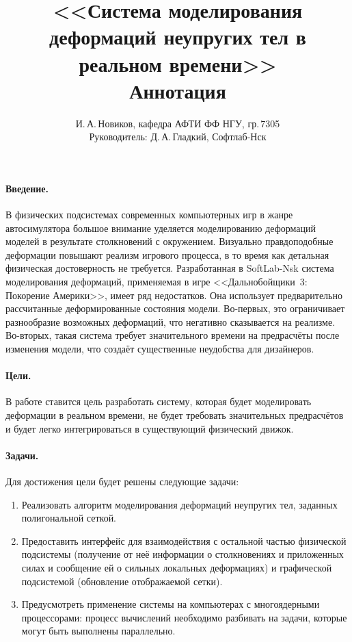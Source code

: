 \documentclass[a4paper,11pt,twocolumn]{article}
\author{И.\,А.\,Новиков, кафедра АФТИ ФФ НГУ, гр.\,7305\\ Руководитель: Д.\,А.\,Гладкий, Софтлаб-Нск}
\title{<<Система моделирования деформаций неупругих тел в реальном времени>>\\ Аннотация}
\begin{document}
  \maketitle
  \thispagestyle{empty}
  \paragraph{Введение.}
    В физических подсистемах современных компьютерных игр в жанре автосимулятора большое внимание
    уделяется моделированию деформаций моделей в результате столкновений с окружением. Визуально
    правдоподобные деформации повышают реализм игрового процесса, в то время как детальная
    физическая достоверность не требуется. Разработанная в SoftLab-Nsk система моделирования
    деформаций, применяемая в игре <<Дальнобойщики~3: Покорение Америки>>, имеет ряд недостатков.
    Она использует предварительно рассчитанные деформированные состояния модели. Во-первых, это
    ограничивает разнообразие возможных деформаций, что негативно сказывается на реализме.
    Во-вторых, такая система требует значительного времени на предрасчёты после изменения модели,
    что создаёт существенные неудобства для дизайнеров.
  \paragraph{Цели.}
    В работе ставится цель разработать систему, которая будет моделировать деформации в реальном
    времени, не будет требовать значительных предрасчётов и будет легко интегрироваться в
    существующий физический движок.
  \newpage
  \paragraph{Задачи.}
    Для достижения цели будет решены следующие задачи:
    \begin{enumerate}
      \item Реализовать алгоритм моделирования деформаций неупругих тел, заданных полигональной сеткой.
      \item Предоставить интерфейс для взаимодействия с остальной частью физической подсистемы
        (получение от неё информации о столкновениях и приложенных силах и сообщение ей о
        сильных локальных деформациях) и графической подсистемой (обновление отображаемой сетки).
      \item Предусмотреть применение системы на компьютерах с многоядерными процессорами: процесс
        вычислений необходимо разбивать на задачи, которые могут быть выполнены параллельно.
    \end{enumerate}
\end{document}
